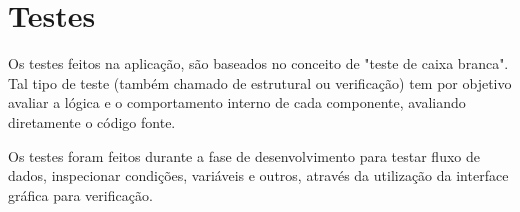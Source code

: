 \section{Testes}

Os testes feitos na aplicação, são baseados no conceito de "teste de caixa branca". Tal tipo de teste (também chamado de estrutural ou verificação) tem por objetivo avaliar a lógica e o comportamento interno de cada componente, avaliando diretamente o código fonte.

Os testes foram feitos durante a fase de desenvolvimento para testar fluxo de dados, inspecionar condições, variáveis e outros, através da utilização da interface gráfica para verificação.


